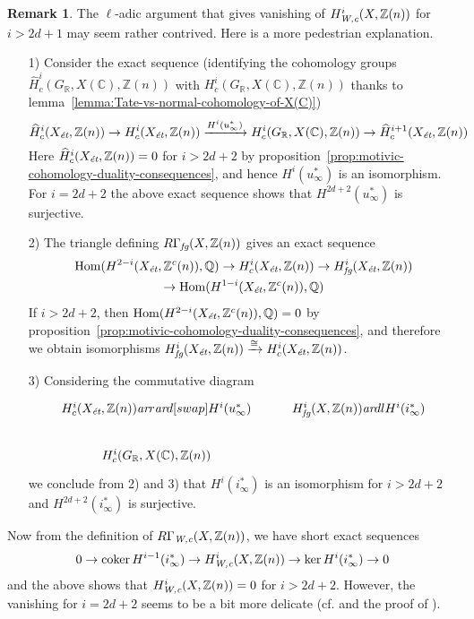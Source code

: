 \documentclass[leqno,12pt]{article}
\theoremstyle{plain}
\theoremstyle{definition}
\newtheorem{remark}[theorem]{\indent\sc Remark}
\DeclareMathOperator{\Hom}{Hom}
\DeclareMathOperator{\coker}{coker}
\newcommand{\ZZ}{\mathbb{Z}}
\newcommand{\QQ}{\mathbb{Q}}
\newcommand{\RR}{\mathbb{R}}
\newcommand{\CC}{\mathbb{C}}
\newcommand{\Wc}{\text{\it W,c}}
\newcommand{\et}{\text{\it \'{e}t}}
\newcommand{\fg}{\text{\it fg}}
\newcommand{\ar}{\text{\it ar}}
\begin{document}
\begin{remark}
  The $\ell$-adic argument that gives vanishing of $H^i_\Wc (X, \ZZ(n))$ for
  $i > 2d+1$ may seem rather contrived. Here is a more pedestrian explanation.

  \begin{enumerate}
  \item[1)] Consider the exact sequence
    (identifying the cohomology groups
    $\widehat{H}^i_c (G_\RR, X (\CC), \ZZ (n))$ with
    $H^i_c (G_\RR, X (\CC), \ZZ (n))$
    thanks to lemma~\ref{lemma:Tate-vs-normal-cohomology-of-X(C)})
    \[ \widehat{H}^i_c (X_\et, \ZZ(n)) \to H^i_c (X_\et, \ZZ(n))
      \xrightarrow{H^i (u_\infty^*)} H^i_c (G_\RR, X (\CC), \ZZ (n)) \to
      \widehat{H}^{i+1}_c (X_\et, \ZZ(n)) \]
    Here $\widehat{H}^i_c (X_\et, \ZZ(n)) = 0$ for $i > 2d+2$
    by proposition~\ref{prop:motivic-cohomology-duality-consequences},
    and hence $H^i (u_\infty^*)$ is an isomorphism.
    For $i = 2d+2$ the above exact sequence shows that $H^{2d+2} (u_\infty^*)$
    is surjective.

  \item[2)] The triangle defining $R\Gamma_\fg (X, \ZZ(n))$ gives an exact sequence
    \begin{multline*}
      \Hom (H^{2-i} (X_\et, \ZZ^c (n)), \QQ) \to
      H^i_c (X_\et, \ZZ(n)) \to
      H^i_\fg (X_\et, \ZZ(n)) \\
      \to \Hom (H^{1-i} (X_\et, \ZZ^c (n)), \QQ)
    \end{multline*}
    If $i > 2d + 2$, then $\Hom (H^{2-i} (X_\et, \ZZ^c (n)), \QQ) = 0$ by
    proposition~\ref{prop:motivic-cohomology-duality-consequences}, and
    therefore we obtain isomorphisms
    $H^i_\fg (X_\et, \ZZ(n)) \xrightarrow{\cong} H^i_c (X_\et, \ZZ(n))$.

  \item[3)] Considering the commutative diagram
    \[ \begin{tikzcd}
        H^i_c (X_\et, \ZZ(n)) \ar{r}\ar{d}[swap]{H^i (u_\infty^*)} & H^i_\fg (X, \ZZ(n))\ar{dl}{H^i (i_\infty^*)} \\
        H^i_c (G_\RR, X (\CC), \ZZ (n))
      \end{tikzcd} \]
    we conclude from 2) and 3) that $H^i (i_\infty^*)$ is an isomorphism for
    $i > 2d+2$ and $H^{2d+2} (i_\infty^*)$ is surjective.
  \end{enumerate}

  Now from the definition of $R\Gamma_\Wc (X, \ZZ(n))$, we have short exact
  sequences
  \[ 0 \to \coker H^{i-1} (i_\infty^*) \to
    H^i_\Wc (X, \ZZ(n)) \to
    \ker H^i (i_\infty^*) \to 0 \]
  and the above shows that $H^i_\Wc (X, \ZZ(n)) = 0$ for $i > 2d+2$.
  However, the vanishing for $i = 2d+2$ seems to be a bit more delicate
  (cf. \cite[p.\,991]{Kahn-2003-equivalences} and the proof of
  \cite[Theorem~7.3]{Geisser-2004}).
\end{remark}
\end{document}
